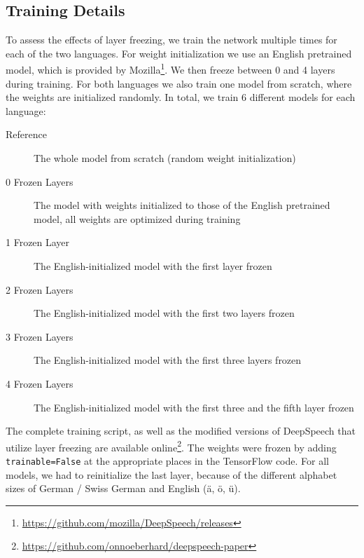 \documentclass[11pt]{article}
\newcommand{\tz}[1]{\textcolor{red}{\textbf{TZ:} #1}}
\newcommand{\tz}[1]{}
\begin{document}
\subsection{Training Details} \label{sec:training}
To assess the effects of layer freezing, we train the network multiple times for each of the two languages. For weight initialization we use an English pretrained model, which is provided by Mozilla\footnote{\url{https://github.com/mozilla/DeepSpeech/releases}}. We then freeze between 0 and 4 layers during training. For both languages we also train one model from scratch, where the weights are initialized randomly. In total, we train 6 different models for each language:
\begin{description}
    \item[Reference] The whole model from scratch (random weight initialization)
    \item[0 Frozen Layers] The model with weights initialized to those of the English pretrained model, all weights are optimized during training
    \item[1 Frozen Layer] The English-initialized model with the first layer frozen
    \item[2 Frozen Layers] The English-initialized model with the first two layers frozen
    \item[3 Frozen Layers] The English-initialized model with the first three layers frozen
    \item[4 Frozen Layers] The English-initialized model with the first three and the fifth layer frozen
\end{description}
The complete training script, as well as the modified versions of DeepSpeech that utilize layer freezing are available online\footnote{\url{https://github.com/onnoeberhard/deepspeech-paper}}.
The weights were frozen by adding \texttt{trainable=False} at the appropriate places in the TensorFlow code. For all models, we had to reinitialize the last layer, because of the different alphabet sizes of German / Swiss German and English (ä, ö, ü).
%
\end{document}

